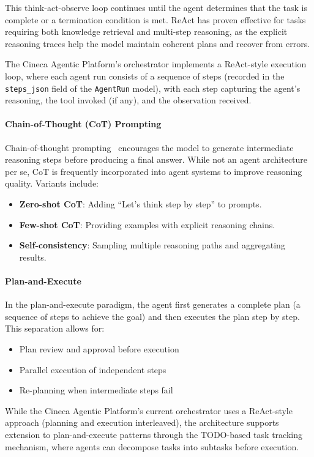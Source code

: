This think-act-observe loop continues until the agent determines that the task is complete or a termination condition is met. ReAct has proven effective for tasks requiring both knowledge retrieval and multi-step reasoning, as the explicit reasoning traces help the model maintain coherent plans and recover from errors.

The Cineca Agentic Platform's orchestrator implements a ReAct-style execution loop, where each agent run consists of a sequence of steps (recorded in the \texttt{steps\_json} field of the \texttt{AgentRun} model), with each step capturing the agent's reasoning, the tool invoked (if any), and the observation received.

\paragraph{Chain-of-Thought (CoT) Prompting}
Chain-of-thought prompting~%
encourages the model to generate intermediate reasoning steps before producing a final answer. While not an agent architecture per se, CoT is frequently incorporated into agent systems to improve reasoning quality. Variants include:
\begin{itemize}
    \item \textbf{Zero-shot CoT}: Adding ``Let's think step by step'' to prompts.
    \item \textbf{Few-shot CoT}: Providing examples with explicit reasoning chains.
    \item \textbf{Self-consistency}: Sampling multiple reasoning paths and aggregating results.
\end{itemize}

\paragraph{Plan-and-Execute}
In the plan-and-execute paradigm, the agent first generates a complete plan (a sequence of steps to achieve the goal) and then executes the plan step by step. This separation allows for:
\begin{itemize}
    \item Plan review and approval before execution
    \item Parallel execution of independent steps
    \item Re-planning when intermediate steps fail
\end{itemize}

While the Cineca Agentic Platform's current orchestrator uses a ReAct-style approach (planning and execution interleaved), the architecture supports extension to plan-and-execute patterns through the TODO-based task tracking mechanism, where agents can decompose tasks into subtasks before execution.

